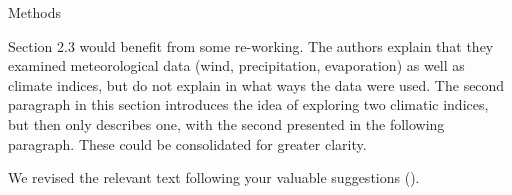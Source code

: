 \documentclass[12pt,english]{reviewresponse}
\begin{document}
\begin{revcomment}
	Methods

    Section 2.3 would benefit from some re-working. The authors explain that they examined meteorological data (wind, precipitation, evaporation) as well as climate indices, but do not explain in what ways the data were used. The second paragraph in this section introduces the idea of exploring two climatic indices, but then only describes one, with the second presented in the following paragraph. These could be consolidated for greater clarity.
\end{revcomment}
\begin{revresponse}
	We revised the relevant text following your valuable suggestions ().
\end{revresponse}
\end{document}
